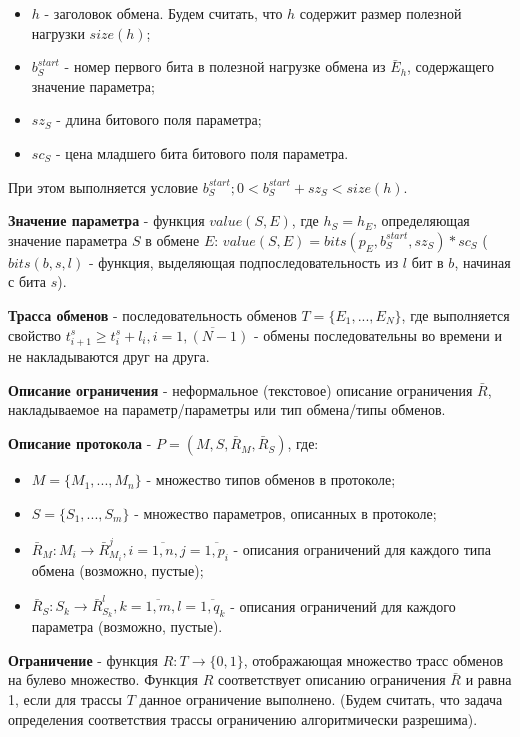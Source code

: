 \begin{itemize}
 \item $h$ - заголовок обмена. Будем считать, что $h$ содержит размер полезной 
нагрузки $size(h)$;
 \item $b^{start}_S$ - номер первого бита в полезной нагрузке обмена из 
$\bar{E}_h$, содержащего значение параметра;
 \item $sz_S$ - длина битового поля параметра;
 \item $sc_S$ - цена младшего бита битового поля параметра.
\end{itemize}

При этом выполняется условие $b^{start}_S; 0 < b^{start}_S + sz_S < size(h)$.

\textbf{Значение параметра} - функция $value(S, E)$, где $h_S = h_E$, 
определяющая значение параметра $S$ в обмене $E$: $value(S, E) = bits(p_E, 
b^{start}_S, sz_S) * sc_S$ ($bits(b, s, l)$ - функция, выделяющая 
подпоследовательность из $l$ бит в $b$, начиная с бита $s$).

\textbf{Трасса обменов} - последовательность обменов $T = \{E_1, ..., E_N\}$, 
где выполняется свойство $t^s_{i+1} \geq t^s_{i} + l_{i}, i = 
\overline{1,(N-1)}$ - обмены последовательны во времени и не накладываются друг 
на друга.


\textbf{Описание ограничения} - неформальное (текстовое) описание ограничения 
$\bar{R}$, накладываемое на параметр/параметры или тип обмена/типы обменов.

\textbf{Описание протокола} - $P = (M, S, \bar{R}_M, \bar{R}_S)$, где:
 \begin{itemize}
  \item $M = \{M_1, ..., M_n\}$ - множество типов обменов в протоколе;
  \item $S = \{S_1, ..., S_m\}$ - множество параметров, описанных в протоколе;
  \item $\bar{R}_M: M_i \rightarrow \bar{R}_{M_i}^{j}, i = \overline{1,n}, j = 
\overline{1,p_i}$ - описания ограничений для каждого типа
обмена (возможно, пустые);
  \item $\bar{R}_S: S_k \rightarrow \bar{R}_{S_k}^{l}, k = \overline{1,m}, l = 
\overline{1, 
q_k}$ - описания ограничений для каждого параметра (возможно, пустые).
\end{itemize}

\textbf{Ограничение} - функция $R: T \rightarrow \{0, 1\}$, отображающая 
множество трасс обменов на булево множество. Функция $R$ соответствует описанию 
ограничения $\bar{R}$ и равна 1, если для трассы $T$ данное ограничение 
выполнено. (Будем считать, что задача определения соответствия трассы 
ограничению алгоритмически разрешима).
 
